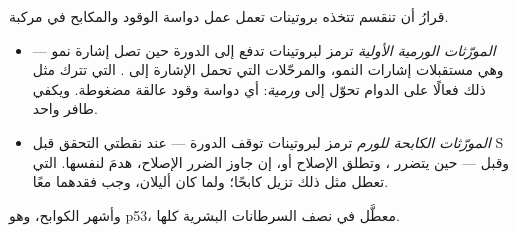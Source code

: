 \begin{proposition}\label{prop:g11:cancer:genes}
قرارُ  أن تنقسم تتخذه بروتينات تعمل عمل دواسة الوقود والمكابح في
مركبة.
\begin{itemize}
  \item \emph{المورّثات الورمية الأولية}
        ترمز لبروتينات تدفع  إلى الدورة حين تصل إشارة نمو ---
        وهي مستقبلات إشارات النمو، والمرحّلات التي تحمل الإشارة إلى
        .  التي تترك مثل ذلك  فعالًا على الدوام
        تحوّل  إلى \emph{ ورمية}: أي دواسة وقود عالقة
        مضغوطة. ويكفي  طافر واحد.
  \item \emph{المورّثات الكابحة للورم}
        ترمز لبروتينات توقف الدورة --- عند نقطتي التحقق قبل S وقبل
         --- حين يتضرر ، وتطلق الإصلاح أو، إن جاوز
        الضرر الإصلاح، هدمَ  لنفسها.  التي تعطل مثل ذلك
         تزيل كابحًا؛ ولما كان  أليلان، وجب فقدهما معًا.
\end{itemize}
وأشهر الكوابح، وهو  p53، معطَّل في نصف السرطانات البشرية كلها.
\end{proposition}
\admitted

